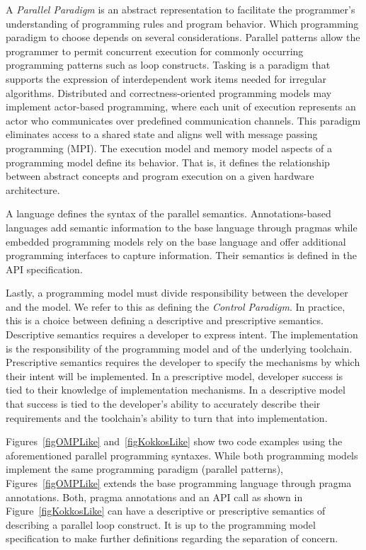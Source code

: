 A \emph{Parallel Paradigm} is an abstract representation to facilitate the programmer's understanding of programming rules and program behavior. Which programming paradigm to choose depends on several considerations. Parallel patterns allow the programmer to permit concurrent execution for commonly occurring programming patterns such as loop constructs. Tasking is a paradigm that supports the expression of interdependent work items needed for irregular algorithms. Distributed and correctness-oriented programming models may implement actor-based programming, where each unit of execution represents an actor who communicates over predefined communication channels. This paradigm eliminates access to a shared state and aligns well with message passing programming (MPI). The execution model and memory model aspects of a programming model define its behavior. That is, it defines the relationship between abstract concepts and program execution on a given hardware architecture.

A language defines the syntax of the parallel semantics. Annotations-based languages add semantic information to the base language through pragmas while embedded programming models rely on the base language and offer additional programming interfaces to capture information. Their semantics is defined in the API specification. 

Lastly, a programming model must divide responsibility between the developer and the model. We refer to this as defining the \emph{Control Paradigm}. In practice, this is a choice between defining a descriptive and prescriptive semantics. Descriptive semantics requires a developer to express intent. The implementation is the responsibility of the programming model and of the underlying toolchain. Prescriptive semantics requires the developer to specify the mechanisms by which their intent will be implemented. In a prescriptive model, developer success is tied to their knowledge of implementation mechanisms. In a descriptive model that success is tied to the developer's ability to accurately describe their requirements and the toolchain's ability to turn that into implementation. 

Figures~\ref{figOMPLike} and~\ref{figKokkosLike} show two code examples using the aforementioned parallel programming syntaxes. While both programming models implement the same programming paradigm (parallel patterns), Figures~\ref{figOMPLike} extends the base programming language through pragma annotations. Both, pragma annotations and an API call as shown in Figure~\ref{figKokkosLike} can have a descriptive or prescriptive semantics of describing a parallel loop construct. It is up to the programming model specification to make further definitions regarding the separation of concern.

